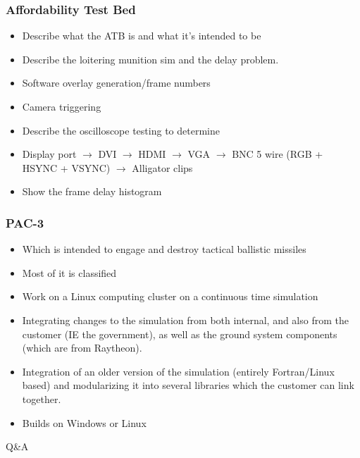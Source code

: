 \documentclass[aspectratio=169]{beamer}
\begin{document}
\begin{frame}
  \frametitle{Affordability Test Bed}
  \begin{itemize}
  \item Describe what the ATB is and what it's intended to be
  \item Describe the loitering munition sim and the delay problem.
  \item Software overlay generation/frame numbers
  \item Camera triggering
  \item Describe the oscilloscope testing to determine 
  \item Display port $\rightarrow$ DVI $\rightarrow$ HDMI $\rightarrow$ VGA $\rightarrow$ BNC 5 wire (RGB + HSYNC + VSYNC) $\rightarrow$ Alligator clips
  \item Show the frame delay histogram
  \end{itemize}
\end{frame}


\begin{frame}
  \frametitle{PAC-3} %
  \begin{itemize}
  \item Which is intended to engage and destroy tactical ballistic missiles
  \item Most of it is classified
  \item Work on a Linux computing cluster on a continuous time simulation
  \item Integrating changes to the simulation from both internal, and also from the customer (IE the government), as well as the ground system components (which are from Raytheon).
  \item Integration of an older version of the simulation (entirely Fortran/Linux based) and modularizing it into several libraries which the customer can link together.  
  \item Builds on Windows or Linux
  \end{itemize}
\end{frame}

\begin{frame}
\Huge{\centerline{Q\&A}}
\end{frame}
\end{document}
